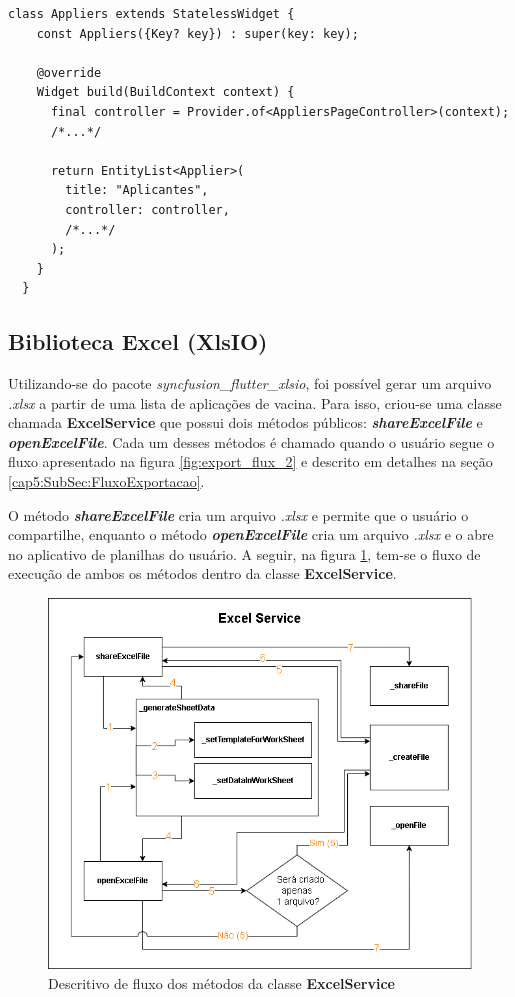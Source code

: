\begin{lstlisting}[caption={Uso do \textit{Provider} no \textit{widget} \textbf{Appliers}}, label={lst:appliers_page_provider}]
  class Appliers extends StatelessWidget {
    const Appliers({Key? key}) : super(key: key);

    @override
    Widget build(BuildContext context) {
      final controller = Provider.of<AppliersPageController>(context);
      /*...*/

      return EntityList<Applier>(
        title: "Aplicantes",
        controller: controller,
        /*...*/
      );
    }
  }
\end{lstlisting}

\subsection{Biblioteca Excel (XlsIO)}
\label{cap4:Subsec:syncfusion_flutter_xlsio}
Utilizando-se do pacote \textit{syncfusion\_flutter\_xlsio}, foi possível gerar um arquivo \textit{.xlsx} a partir de uma lista de aplicações de vacina. Para isso, criou-se uma classe chamada \textbf{ExcelService} que possui dois métodos públicos: \textbf{\textit{shareExcelFile}} e \textbf{\textit{openExcelFile}}. Cada um desses métodos é chamado quando o usuário segue o fluxo apresentado na figura \ref{fig:export_flux_2} e descrito em detalhes na seção \ref{cap5:SubSec:FluxoExportacao}.

O método \textbf{\textit{shareExcelFile}} cria um arquivo \textit{.xlsx} e permite que o usuário o compartilhe, enquanto o método \textbf{\textit{openExcelFile}} cria um arquivo \textit{.xlsx} e o abre no aplicativo de planilhas do usuário. A seguir, na figura \ref{fig:excel_service_diagram}, tem-se o fluxo de execução de ambos os métodos dentro da classe \textbf{ExcelService}.

\begin{figure}[!ht]
  \centering
  \includegraphics[width=\textwidth]{figuras/cap4/4_3_4_excel_service_diagram.png}
  \caption{Descritivo de fluxo dos métodos da classe \textbf{ExcelService}}
  \label{fig:excel_service_diagram}
\end{figure}

